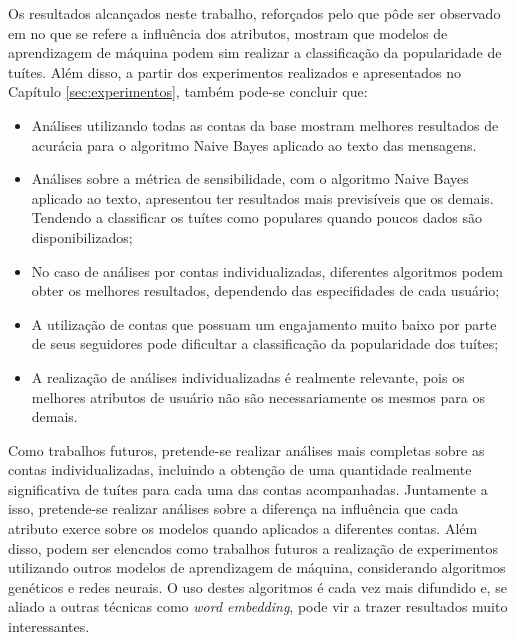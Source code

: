 \documentclass[oneside,openright,12pt]{ufsm_2015} %
\begin{document}
    \par Os resultados alcançados neste trabalho, reforçados pelo que pôde ser observado em \cite{artigo:oliveira:18} no que se refere a influência dos atributos, mostram que modelos de aprendizagem de máquina podem sim realizar a classificação da popularidade de tuítes. Além disso, a partir dos experimentos realizados e apresentados no Capítulo \ref{sec:experimentos}, também pode-se concluir que:
    
    \begin{itemize}
        \item Análises utilizando todas as contas da base mostram melhores resultados de acurácia para o algoritmo Naive Bayes aplicado ao texto das mensagens. 
        \item Análises sobre a métrica de sensibilidade, com o algoritmo Naive Bayes aplicado ao texto, apresentou ter resultados mais previsíveis que os demais. Tendendo a classificar os tuítes como populares quando poucos dados são disponibilizados;
        \item No caso de análises por contas individualizadas, diferentes algoritmos podem obter os melhores resultados, dependendo das especifidades de cada usuário;
        \item A utilização de contas que possuam um engajamento muito baixo por parte de seus seguidores pode dificultar a classificação da popularidade dos tuítes;
        \item A realização de análises individualizadas é realmente relevante, pois os melhores atributos de usuário não são necessariamente os mesmos para os demais.
    \end{itemize}

    \par Como trabalhos futuros, pretende-se realizar análises mais completas sobre as contas individualizadas, incluindo a obtenção de uma quantidade realmente significativa de tuítes para cada uma das contas acompanhadas. Juntamente a isso, pretende-se realizar análises sobre a diferença na influência que cada atributo exerce sobre os modelos quando aplicados a diferentes contas. Além disso, podem ser elencados como trabalhos futuros a realização de experimentos utilizando outros modelos de aprendizagem de máquina, considerando algoritmos genéticos e redes neurais. O uso destes algoritmos é cada vez mais difundido e, se aliado a outras técnicas como \textit{word embedding}, pode vir a trazer resultados muito interessantes.

\end{document}
